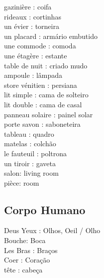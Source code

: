\documentclass{article}
\begin{document}
                 gazinière     : coifa\\
                 rideaux       : cortinhas\\
        un       évier         : torneira\\
        un       placard       : armário embutido\\
        une      commode       : comoda\\
        une      étagère       : estante\\
        table    de nuit       : criado mudo\\
                 ampoule       : lâmpada\\
        store    vénitien      : persiana\\
        lit      simple        : cama de solteiro\\
        lit      double        : cama de casal\\
        panneau  solaire       : painel solar\\
        porte    savon         : saboneteira\\
                 tableau       : quadro\\
                 matelas       : colchão\\
        le       fauteuil      : poltrona\\
        un       tiroir        : gaveta\\
        salon: living room\\
        pièce: room\\
        
        
    \subsection{Corpo Humano}
        Deus Yeux  : Olhos, Oeil / Olho\\
             Bouche: Boca\\
        Les  Bras  : Braços\\
             Coer  : Coração\\
             tête  : cabeça\\
\end{document}
